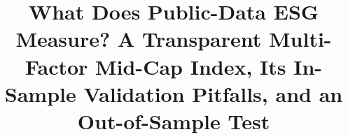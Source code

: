 \documentclass[conference]{Thesis}
\begin{document}
\title{What Does Public-Data ESG Measure? A Transparent Multi-Factor
Mid-Cap Index, Its In-Sample Validation Pitfalls, and an Out-of-Sample Test}

\newcommand{\RepoNote}{ (\url{https://github.com/Shashwat1729/esg-hybrid-index})}
\author{
\and
{}
\and
{}
}

\maketitle













\appendices

\end{document}
